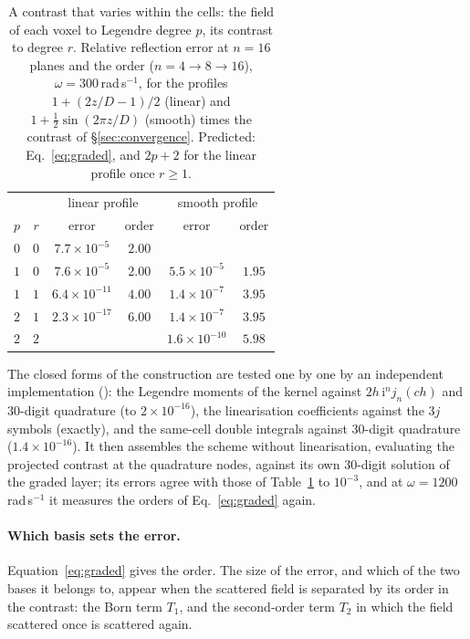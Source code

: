 \documentclass[11pt,a4paper]{article}
\begin{document}
\begin{table}[htbp]
\centering
\caption{A contrast that varies within the cells: the field of each voxel to Legendre degree $p$, its
contrast to degree $r$. Relative reflection error at $n=16$ planes and the order ($n=4\to8\to16$),
$\omega=300$\,rad\,s$^{-1}$, for the profiles $1+(2z/D-1)/2$ (linear) and $1+\tfrac12\sin(2\pi z/D)$
(smooth) times the contrast of \S\ref{sec:convergence}. Predicted: Eq.~\eqref{eq:graded}, and $2p+2$
for the linear profile once $r\ge1$.}\label{tab:graded}
\small
\begin{tabular}{@{}cccccc@{}}
\toprule
 & & \multicolumn{2}{c}{linear profile} & \multicolumn{2}{c}{smooth profile} \\
$p$ & $r$ & error & order & error & order \\
\midrule
$0$ & $0$ & $7.7\times10^{-5}$ & $2.00$ & & \\
$1$ & $0$ & $7.6\times10^{-5}$ & $2.00$ & $5.5\times10^{-5}$ & $1.95$ \\
$1$ & $1$ & $6.4\times10^{-11}$ & $4.00$ & $1.4\times10^{-7}$ & $3.95$ \\
$2$ & $1$ & $2.3\times10^{-17}$ & $6.00$ & $1.4\times10^{-7}$ & $3.95$ \\
$2$ & $2$ & & & $1.6\times10^{-10}$ & $5.98$ \\
\bottomrule
\end{tabular}
\end{table}
The closed forms of the construction are tested one by one by an independent implementation
(): the Legendre moments of the kernel against
$2h\,\mathrm{i}^nj_n(ch)$ and 30-digit quadrature (to $2\times10^{-16}$), the linearisation
coefficients against the $3j$ symbols (exactly), and the same-cell double integrals against 30-digit
quadrature ($1.4\times10^{-16}$). It then assembles the scheme without linearisation, evaluating the
projected contrast at the quadrature nodes, against its own 30-digit solution of the graded layer; its
errors agree with those of Table~\ref{tab:graded} to $10^{-3}$, and at $\omega=1200$\,rad\,s$^{-1}$ it
measures the orders of Eq.~\eqref{eq:graded} again.

\paragraph{Which basis sets the error.} Equation~\eqref{eq:graded} gives the order. The size of the
error, and which of the two bases it belongs to, appear when the scattered field is separated by its
order in the contrast: the Born term $T_1$, and the second-order term $T_2$ in which the field
scattered once is scattered again.
\end{document}
